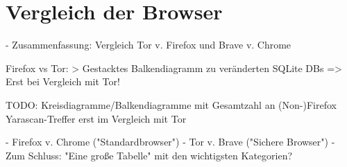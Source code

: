 \chapter{Vergleich der Browser}

- Zusammenfassung: Vergleich Tor v. Firefox und Brave v. Chrome

Firefox vs Tor:
	> Gestacktes Balkendiagramm zu veränderten SQLite DBs => Erst bei Vergleich mit Tor!
	
TODO: Kreisdiagramme/Balkendiagramme mit Gesamtzahl an (Non-)Firefox Yarascan-Treffer erst im Vergleich mit Tor

- Firefox v. Chrome ("Standardbrowser")
- Tor v. Brave ("Sichere Browser")
- Zum Schluss: "Eine große Tabelle" mit den wichtigsten Kategorien?